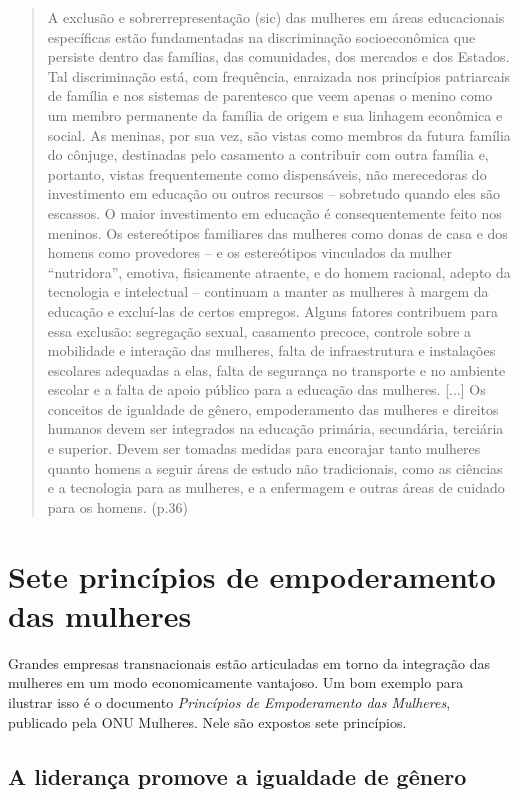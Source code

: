 \begin{quote}
A exclusão e sobrerrepresentação (sic) das mulheres em áreas
educacionais específicas estão fundamentadas na discriminação
socioeconômica que persiste dentro das famílias, das comunidades, dos
mercados e dos Estados. Tal discriminação está, com frequência,
enraizada nos princípios patriarcais de família e nos sistemas de
parentesco que veem apenas o menino como um membro permanente da família
de origem e sua linhagem econômica e social. As meninas, por sua vez,
são vistas como membros da futura família do cônjuge, destinadas pelo
casamento a contribuir com outra família e, portanto, vistas
frequentemente como dispensáveis, não merecedoras do investimento em
educação ou outros recursos -- sobretudo quando eles são escassos. O
maior investimento em educação é consequentemente feito nos meninos. Os
estereótipos familiares das mulheres como donas de casa e dos homens
como provedores -- e os estereótipos vinculados da mulher ``nutridora'',
emotiva, fisicamente atraente, e do homem racional, adepto da tecnologia
e intelectual -- continuam a manter as mulheres à margem da educação e
excluí-las de certos empregos. Alguns fatores contribuem para essa
exclusão: segregação sexual, casamento precoce, controle sobre a
mobilidade e interação das mulheres, falta de infraestrutura e
instalações escolares adequadas a elas, falta de segurança no transporte
e no ambiente escolar e a falta de apoio público para a educação das
mulheres. {[}...{]} Os conceitos de igualdade de gênero, empoderamento
das mulheres e direitos humanos devem ser integrados na educação
primária, secundária, terciária e superior. Devem ser tomadas medidas
para encorajar tanto mulheres quanto homens a seguir áreas de estudo não
tradicionais, como as ciências e a tecnologia para as mulheres, e a
enfermagem e outras áreas de cuidado para os homens. (p.36)
\end{quote}

\chapter{Sete princípios de empoderamento das mulheres}

Grandes empresas transnacionais estão articuladas em torno da integração
das mulheres em um modo economicamente vantajoso. Um bom exemplo para
ilustrar isso é o documento \emph{Princípios de Empoderamento das
Mulheres}, publicado pela ONU Mulheres. Nele são expostos sete
princípios.

\section{A liderança promove a igualdade de gênero}

